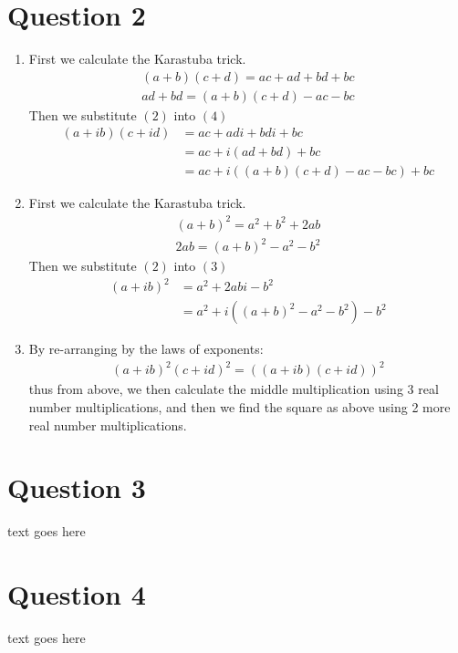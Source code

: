 \documentclass{article}
\begin{document}
\section*{Question 2}
\begin{enumerate}[label=\alph*)]
    \item
        First we calculate the Karastuba trick.
        \setcounter{equation}{0}
        \begin{gather}
            (a + b)(c + d) = ac + ad + bd + bc \\
            ad + bd = (a + b)(c + d) - ac - bc
        \end{gather}
        Then we substitute $(2)$ into $(4)$
        \begin{align}
            (a + ib)(c + id) &= ac + adi + bdi + bc \\
            &= ac + i(ad + bd) + bc \\
            &= ac + i((a + b)(c + d) - ac - bc) + bc
        \end{align}
    \item
        \setcounter{equation}{0}
        First we calculate the Karastuba trick.
        \begin{gather}
            (a + b)^2 = a^2 + b^2 + 2ab \\
            2ab = (a + b)^2 - a^2 - b^2
        \end{gather}
        Then we substitute $(2)$ into $(3)$
        \begin{align}
            (a + ib)^2 &= a^2 + 2abi - b^2 \\
            &= a^2 + i((a + b)^2 - a^2 - b^2) - b^2
        \end{align}
    \item
        \setcounter{equation}{0}
        By re-arranging by the laws of exponents:
        \begin{gather*}
            (a+ib)^2(c+id)^2 = ((a+ib)(c+id))^2
        \end{gather*}
        thus from above, we then calculate the middle multiplication using
        3 real number multiplications, and then we find the square as above
        using 2 more real number multiplications.
\end{enumerate}

\section*{Question 3}
\indent text goes here

\section*{Question 4}
text goes here
\end{document}
